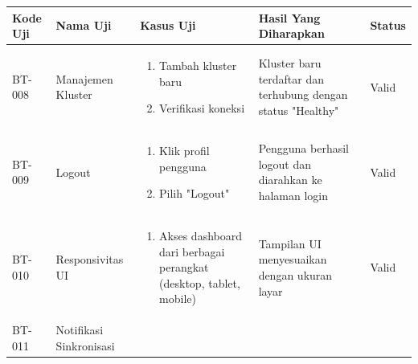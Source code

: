 \newpage
\clearpage
\begin{table}[H]
  \centering
  \small
  \begin{adjustbox}{width=\textwidth}
    \begin{tabular}{|p{0.8cm}|p{2.2cm}|p{4cm}|p{3.5cm}|p{1.2cm}|}
      \hline
      \textbf{Kode Uji} & \textbf{Nama Uji}       & \textbf{Kasus Uji}                                                      & \textbf{Hasil Yang Diharapkan}                               & \textbf{Status} \\
      \hline
      BT-008            & Manajemen Kluster       & \begin{enumerate}[leftmargin=*,noitemsep,topsep=0pt,label=\arabic*.,widest=99]
                                                      \item Tambah kluster baru
                                                      \item Verifikasi koneksi
                                                    \end{enumerate}       & Kluster baru terdaftar dan terhubung dengan status "Healthy" & Valid                                                             \\ \hline
      BT-009            & Logout                  & \begin{enumerate}[leftmargin=*,noitemsep,topsep=0pt,label=\arabic*.,widest=99]
                                                      \item Klik profil pengguna
                                                      \item Pilih "Logout"
                                                    \end{enumerate}       & Pengguna berhasil logout dan diarahkan ke halaman login      & Valid                                                             \\ \hline
      BT-010            & Responsivitas UI        & \begin{enumerate}[leftmargin=*,noitemsep,topsep=0pt,label=\arabic*.,widest=99]
                                                      \item Akses dashboard dari berbagai perangkat (desktop, tablet, mobile)
                                                    \end{enumerate} & Tampilan UI menyesuaikan dengan ukuran layar                 & Valid                                                                   \\ \hline
      BT-011            & Notifikasi Sinkronisasi & \begin{enumerate}[leftmargin=*,noitemsep,topsep=0pt,label=\arabic*.,widest=99]

\end{enumerate}
\end{tabular}
\end{adjustbox}
\end{table}
